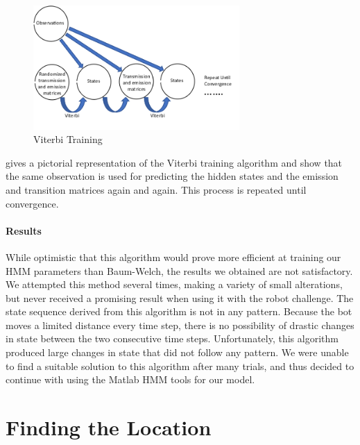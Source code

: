 \documentclass[twoside]{article}
\begin{document}
\begin{figure}[h]
  \centering
  \includegraphics[width=0.7\textwidth]{images/viterbi-training}
  \caption{Viterbi Training}\label{fig:viterbi-training}
\end{figure}

 gives a pictorial representation of the Viterbi training algorithm and show that the same observation is used for predicting the hidden states and the emission and transition matrices again and again.
This process is repeated until convergence.

\paragraph{Results}

While optimistic that this algorithm would prove more efficient at training our HMM parameters than Baum-Welch, the results we obtained are not satisfactory.
We attempted this method several times, making a variety of small alterations, but never received a promising result when using it with the robot challenge.
The state sequence derived from this algorithm is not in any pattern.
Because the bot moves a limited distance every time step, there is no possibility of drastic changes in state between the two consecutive time steps.
Unfortunately, this algorithm produced large changes in state that did not follow any pattern.
We were unable to find a suitable solution to this algorithm after many trials, and thus decided to continue with using the Matlab HMM tools for our model.

\section{Finding the Location}\label{sec:finding-the-locat}
\end{document}
